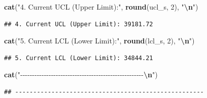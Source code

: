 \documentclass[
]{article}
\newenvironment{Shaded}{\begin{snugshade}}{\end{snugshade}}
\newcommand{\DecValTok}[1]{\textcolor[rgb]{0.00,0.00,0.81}{#1}}
\newcommand{\FunctionTok}[1]{\textcolor[rgb]{0.13,0.29,0.53}{\textbf{#1}}}
\newcommand{\NormalTok}[1]{#1}
\newcommand{\SpecialCharTok}[1]{\textcolor[rgb]{0.81,0.36,0.00}{\textbf{#1}}}
\newcommand{\StringTok}[1]{\textcolor[rgb]{0.31,0.60,0.02}{#1}}
\begin{document}
\begin{Shaded}
\begin{Highlighting}[]
\FunctionTok{cat}\NormalTok{(}\StringTok{"4. Current UCL (Upper Limit):"}\NormalTok{, }\FunctionTok{round}\NormalTok{(ucl\_s, }\DecValTok{2}\NormalTok{), }\StringTok{"}\SpecialCharTok{\textbackslash{}n}\StringTok{"}\NormalTok{)}
\end{Highlighting}
\end{Shaded}

\begin{verbatim}
## 4. Current UCL (Upper Limit): 39181.72
\end{verbatim}

\begin{Shaded}
\begin{Highlighting}[]
\FunctionTok{cat}\NormalTok{(}\StringTok{"5. Current LCL (Lower Limit):"}\NormalTok{, }\FunctionTok{round}\NormalTok{(lcl\_s, }\DecValTok{2}\NormalTok{), }\StringTok{"}\SpecialCharTok{\textbackslash{}n}\StringTok{"}\NormalTok{)}
\end{Highlighting}
\end{Shaded}

\begin{verbatim}
## 5. Current LCL (Lower Limit): 34844.21
\end{verbatim}

\begin{Shaded}
\begin{Highlighting}[]
\FunctionTok{cat}\NormalTok{(}\StringTok{"{-}{-}{-}{-}{-}{-}{-}{-}{-}{-}{-}{-}{-}{-}{-}{-}{-}{-}{-}{-}{-}{-}{-}{-}{-}{-}{-}{-}{-}{-}{-}{-}{-}{-}{-}{-}{-}{-}{-}{-}{-}{-}{-}{-}{-}{-}{-}{-}{-}{-}{-}{-}}\SpecialCharTok{\textbackslash{}n}\StringTok{"}\NormalTok{)}
\end{Highlighting}
\end{Shaded}

\begin{verbatim}
## ----------------------------------------------------
\end{verbatim}
\end{document}
